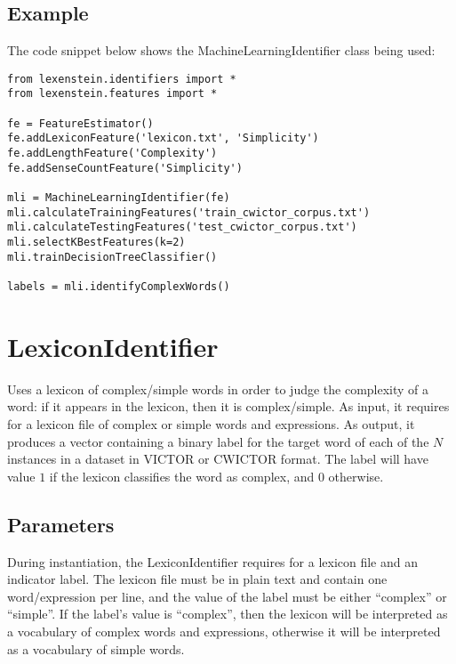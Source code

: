 \subsection{Example}

The code snippet below shows the MachineLearningIdentifier class being used:

\begin{lstlisting}
from lexenstein.identifiers import *
from lexenstein.features import *

fe = FeatureEstimator()
fe.addLexiconFeature('lexicon.txt', 'Simplicity')
fe.addLengthFeature('Complexity')
fe.addSenseCountFeature('Simplicity')

mli = MachineLearningIdentifier(fe)
mli.calculateTrainingFeatures('train_cwictor_corpus.txt')
mli.calculateTestingFeatures('test_cwictor_corpus.txt')
mli.selectKBestFeatures(k=2)
mli.trainDecisionTreeClassifier()

labels = mli.identifyComplexWords()
\end{lstlisting}





\section{LexiconIdentifier}

Uses a lexicon of complex/simple words in order to judge the complexity of a word: if it appears in the lexicon, then it is complex/simple. As input, it requires for a lexicon file of complex or simple words and expressions. As output, it produces a vector containing a binary label for the target word of each of the $N$ instances in a dataset in VICTOR or CWICTOR format. The label will have value $1$ if the lexicon classifies the word as complex, and $0$ otherwise.

\subsection{Parameters}

During instantiation, the LexiconIdentifier requires for a lexicon file and an indicator label. The lexicon file must be in plain text and contain one word/expression per line, and the value of the label must be either ``complex'' or ``simple''. If the label's value is ``complex'', then the lexicon will be interpreted as a vocabulary of complex words and expressions, otherwise it will be interpreted as a vocabulary of simple words.

